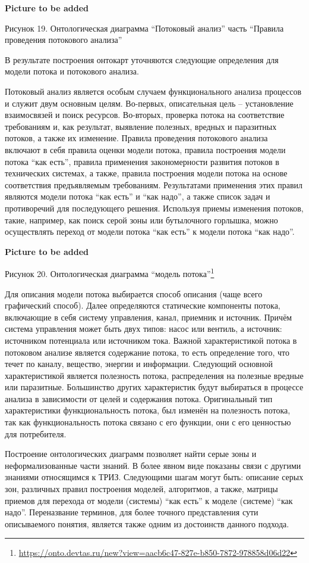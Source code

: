 \documentclass[11pt,a4paper]{article}
\newcommand{\addpicture}{\textbf{Picture to be added}\par}
\begin{document}
\begin{center}
  \addpicture
  Рисунок 19. Онтологическая диаграмма “Потоковый анализ” часть “Правила
  проведения потокового анализа”
\end{center}
В результате построения онтокарт уточняются следующие определения для модели
потока и потокового анализа.

Потоковый анализ является особым случаем функционального анализа процессов и
служит двум основным целям. Во-первых, описательная цель -- установление
взаимосвязей и поиск ресурсов. Во-вторых, проверка потока на соответствие
требованиям и, как результат, выявление полезных, вредных и паразитных
потоков, а также их изменение. Правила проведения потокового анализа включают
в себя правила оценки модели потока, правила построения модели потока “как
есть”, правила применения закономерности развития потоков в технических
системах, а также, правила построения модели потока на основе соответствия
предъявляемым требованиям. Результатами применения этих правил являются модели
потока “как есть” и “как надо”, а также список задач и противоречий для
последующего решения. Используя приемы изменения потоков, такие, например, как
поиск серой зоны или бутылочного горлышка, можно осуществлять переход от
модели потока “как есть” к модели потока “как надо”.
\begin{center}
  \addpicture
  Рисунок 20. Онтологическая диаграмма “модель
  потока”\footnote{\url{https://onto.devtas.ru/new?view=aacb6c47-827e-b850-7872-978858d06d22}} 
\end{center}
Для описания модели потока выбирается способ описания (чаще всего графический
способ). Далее определяются статические компоненты потока, включающие в себя
систему управления, канал, приемник и источник. Причём система управления может
быть двух типов: насос или вентиль, а источник: источником потенциала или
источником тока.  Важной характеристикой потока в потоковом анализе является
содержание потока, то есть определение того, что течет по каналу, вещество,
энергии и информации. Следующий основной характеристикой является полезность
потока, распределения на полезные вредные или паразитные. Большинство других
характеристик будут выбираться в процессе анализа в зависимости от целей и
содержания потока. Оригинальный тип характеристики функциональность потока,
был изменён на полезность потока, так как функциональность потока связано с
его функции, они с его ценностью для потребителя.

Построение онтологических диаграмм позволяет найти серые зоны и
неформализованные части знаний. В более явном виде показаны связи с другими
знаниями относящимся к ТРИЗ. Следующими шагам могут быть: описание серых зон,
различных правил построения моделей, алгоритмов, а также, матрицы приемов для
перехода от модели (системы) “как есть” к моделе (системе) “как надо”.
Переназвание терминов, для более точного представления сути описываемого
понятия, является также одним из достоинств данного подхода.
\end{document}

